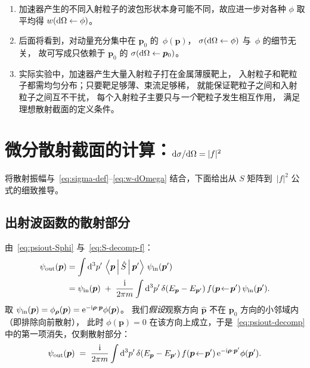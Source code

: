 \begin{remark}[实验上的两个平均]
\begin{enumerate}
\item 加速器产生的不同入射粒子的波包形状本身可能不同，故应进一步对各种 $\phi$ 取平均得 $w(\mathrm{d}\Omega\leftarrow\phi)$。
\item 后面将看到，对动量充分集中在 $\bm{p}_0$ 的~$\phi(\bm{p})$，
$\sigma(\mathrm{d}\Omega\leftarrow\phi)$ 与~$\phi$ 的细节无关，
故可写成只依赖于 $\bm{p}_0$ 的 $\sigma(\mathrm{d}\Omega\leftarrow\bm{p}_0)$。
\item 实际实验中，加速器产生大量入射粒子打在金属薄膜靶上，
入射粒子和靶粒子都需均匀分布；只要靶足够薄、束流足够稀，
就能保证靶粒子之间和入射粒子之间互不干扰，
每个入射粒子主要只与\emph{一个}靶粒子发生相互作用，
满足理想散射截面的定义条件。
\end{enumerate}
\end{remark}

\section{微分散射截面的计算：$\mathrm{d}\sigma/\mathrm{d}\Omega = |f|^2$}

将散射振幅与~\eqref{eq:sigma-def}--\eqref{eq:w-dOmega} 结合，下面给出从 $S$ 矩阵到~$|f|^2$ 公式的细致推导。

\subsection{出射波函数的散射部分}

由~\eqref{eq:psiout-Sphi} 与~\eqref{eq:S-decomp-f}：
\begin{align}
\psi_{\text{out}}(\bm{p})
&= \int \mathrm{d}^3 p'\,\left\langle \bm{p} \,\middle|\, \hat{S} \,\middle|\, \bm{p}' \right\rangle\,\psi_{\text{in}}(\bm{p}') \nonumber\\
&= \psi_{\text{in}}(\bm{p}) \;+\; \frac{\mathrm{i}}{2\pi m}\int \mathrm{d}^3 p'\,
\delta(E_{\bm{p}}-E_{\bm{p}'})\,f(\bm{p}\!\leftarrow\!\bm{p}')\,\psi_{\text{in}}(\bm{p}').
\label{eq:psiout-decomp}
\end{align}
取 $\psi_{\text{in}}(\bm{p}) = \phi_{\bm{\rho}}(\bm{p}) = \mathrm{e}^{-\mathrm{i}\bm{\rho}\cdot\bm{p}}\phi(\bm{p})$。
我们\emph{假设}观察方向 $\hat{\bm{p}}$ 不在 $\bm{p}_0$ 方向的小邻域内（即排除向前散射），
此时 $\phi(\bm{p}) = 0$ 在该方向上成立，于是~\eqref{eq:psiout-decomp} 中的第一项消失，仅剩散射部分：
\begin{equation}
\psi_{\text{out}}(\bm{p}) \;=\; \frac{\mathrm{i}}{2\pi m}\int \mathrm{d}^3 p'\,
\delta(E_{\bm{p}}-E_{\bm{p}'})\,f(\bm{p}\!\leftarrow\!\bm{p}')\,
\mathrm{e}^{-\mathrm{i}\bm{\rho}\cdot\bm{p}'}\phi(\bm{p}').
\label{eq:psiout-scat}
\end{equation}

